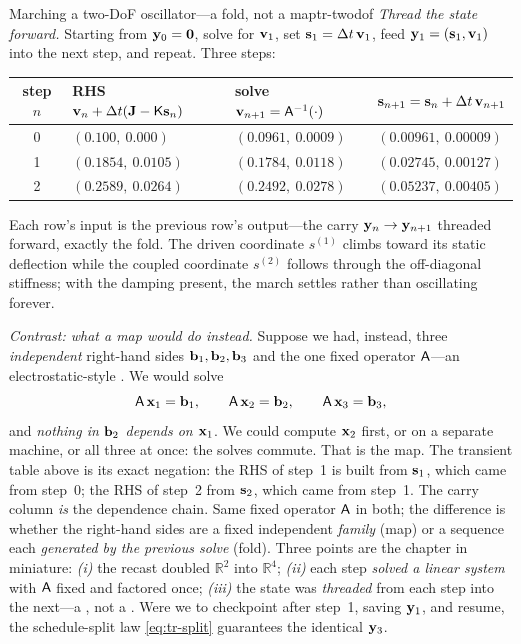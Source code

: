 \begin{workedexample}{Marching a two-DoF oscillator---a fold, not a map}{tr-twodof}
\medskip
\emph{Thread the state forward.} Starting from $\mathbf{y}_0=\mathbf0$, solve for $\mathbf{v}_1$,
set $\mathbf{s}_1=\Delta t\,\mathbf{v}_1$, feed $\mathbf{y}_1=(\mathbf{s}_1,\mathbf{v}_1)$ into the next step, and
repeat. Three steps:
\begin{center}
\setlength{\tabcolsep}{6pt}
\renewcommand{\arraystretch}{1.2}
\begin{tabular}{@{}clll@{}}
\toprule
step $n$ & RHS $\mathbf{v}_n+\Delta t(\mathbf{J}-\mathsf{K}\mathbf{s}_n)$ & solve $\mathbf{v}_{n+1}=\mathsf{A}^{-1}(\cdot)$ & $\mathbf{s}_{n+1}=\mathbf{s}_n+\Delta t\,\mathbf{v}_{n+1}$ \\
\midrule
0 & $(0.100,\ 0.000)$ & $(0.0961,\ 0.0009)$ & $(0.00961,\ 0.00009)$ \\
1 & $(0.1854,\ 0.0105)$ & $(0.1784,\ 0.0118)$ & $(0.02745,\ 0.00127)$ \\
2 & $(0.2589,\ 0.0264)$ & $(0.2492,\ 0.0278)$ & $(0.05237,\ 0.00405)$ \\
\bottomrule
\end{tabular}
\end{center}
Each row's input is the previous row's output---the carry $\mathbf{y}_n\to\mathbf{y}_{n+1}$
threaded forward, exactly the fold. The driven coordinate $s^{(1)}$ climbs toward
its static deflection while the coupled coordinate $s^{(2)}$ follows through the
off-diagonal stiffness; with the damping present, the march settles rather than
oscillating forever.

\medskip
\emph{Contrast: what a  map would do instead.} Suppose we had,
instead, three \emph{independent} right-hand sides $\mathbf{b}_1,\mathbf{b}_2,\mathbf{b}_3$ and the one
fixed operator $\mathsf{A}$---an electrostatic-style . We would solve
\[
  \mathsf{A}\,\mathbf{x}_1=\mathbf{b}_1,\qquad \mathsf{A}\,\mathbf{x}_2=\mathbf{b}_2,\qquad \mathsf{A}\,\mathbf{x}_3=\mathbf{b}_3,
\]
and \emph{nothing in $\mathbf{b}_2$ depends on $\mathbf{x}_1$}. We could compute $\mathbf{x}_2$ first, or
on a separate machine, or all three at once: the solves commute. That is the map. The
transient table above is its exact negation: the RHS of step~1 is built from
$\mathbf{s}_1$, which came from step~0; the RHS of step~2 from $\mathbf{s}_2$, which came from
step~1. The carry column \emph{is} the dependence chain. Same fixed operator $\mathsf{A}$
in both; the difference is whether the right-hand sides are a fixed independent
\emph{family} (map) or a sequence each \emph{generated by the previous solve} (fold).
Three points are the chapter in miniature: \emph{(i)} the recast doubled
$\mathbb R^2$ into $\mathbb R^4$; \emph{(ii)} each step \emph{solved a linear system}
with $\mathsf{A}$ fixed and factored once; \emph{(iii)} the state was \emph{threaded}
from each step into the next---a , not a . Were
we to checkpoint after step~1, saving $\mathbf{y}_1$, and resume, the schedule-split law
\cref{eq:tr-split} guarantees the identical $\mathbf{y}_3$.
\end{workedexample}

